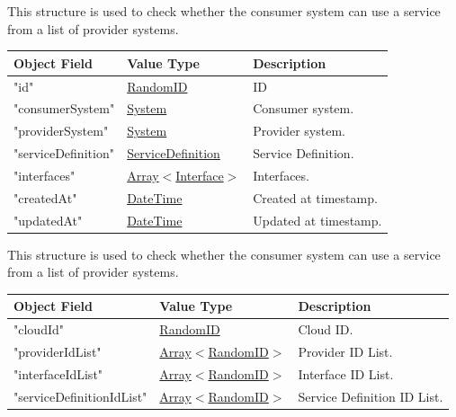 \documentclass[a4paper]{arrowhead}
\newcommand{\mref}[1]{{\textcolor{ArrowheadPurple}{\hyperref[sec:model:#1]{#1}}}}
\newcommand{\pref}[1]{{\textcolor{ArrowheadGrey}{\hyperref[sec:model:primitives:#1]{#1}}}}
\begin{document}

This structure is used to check whether the consumer system can use a service from a list of provider systems.

\begin{table}[ht!]
\begin{tabularx}{\textwidth}{| p{5cm} | p{5cm} | X |} \hline
\rowcolor{gray!33} Object Field & Value Type      & Description \\ \hline
"id"                 & \pref{RandomID}                     & ID \\ \hline
"consumerSystem"     & \pref{System}                     & Consumer system. \\ \hline
"providerSystem"     & \pref{System}                     & Provider system. \\ \hline
"serviceDefinition"  & \pref{ServiceDefinition}            & Service Definition. \\ \hline
"interfaces"         & \pref{Array}$<$\mref{Interface}$>$  & Interfaces. \\ \hline
"createdAt"          & \pref{DateTime}                     & Created at timestamp. \\ \hline
"updatedAt"          & \pref{DateTime}                     & Updated at timestamp. \\ \hline

\end{tabularx}
\end{table}


This structure is used to check whether the consumer system can use a service from a list of provider systems.

\begin{table}[ht!]
\begin{tabularx}{\textwidth}{| p{5cm} | p{5cm} | X |} \hline
\rowcolor{gray!33} Object Field & Value Type      & Description \\ \hline
"cloudId"                   & \pref{RandomID}     & Cloud ID. \\ \hline
"providerIdList"            & \pref{Array}$<$\mref{RandomID}$>$     & Provider ID List. \\ \hline
"interfaceIdList"           & \pref{Array}$<$\mref{RandomID}$>$     & Interface ID List. \\ \hline
"serviceDefinitionIdList"   & \pref{Array}$<$\mref{RandomID}$>$     & Service Definition ID List. \\ \hline

\end{tabularx}
\end{table}
\end{document}
